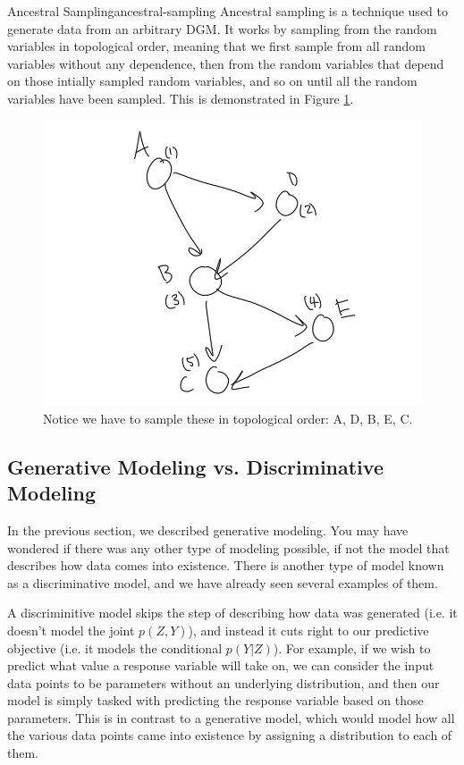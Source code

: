 \begin{definition}{Ancestral Sampling}{ancestral-sampling}
	Ancestral sampling is a technique used to generate data from an arbitrary DGM. It works by sampling from the random variables in topological order, meaning that we first sample from all random variables without any dependence, then from the random variables that depend on those intially sampled random variables, and so on until all the random variables have been sampled. This is demonstrated in Figure \ref{fig:ancestral-sampling}.
\end{definition}
\begin{figure}
	\centering
	\includegraphics[width=0.5\paperwidth]{../GraphicalModels/fig/AncestralSampling.png}
    \caption{Notice we have to sample these in topological order: A, D, B, E, C.}
	\label{fig:ancestral-sampling}
\end{figure}

\subsection{Generative Modeling vs. Discriminative Modeling}
In the previous section, we described generative modeling. You may have wondered if there was any other type of modeling possible, if not the model that describes how data comes into existence. There is another type of model known as a discriminative model, and we have already seen several examples of them.

A discriminitive model skips the step of describing how data was generated (i.e. it doesn't model the joint $p(Z, Y)$), and instead it cuts right to our predictive objective (i.e. it models the conditional $p(Y|Z)$). For example, if we wish to predict what value a response variable will take on, we can consider the input data points to be parameters without an underlying distribution, and then our model is simply tasked with predicting the response variable based on those parameters. This is in contrast to a generative model, which would model how all the various data points came into existence by assigning a distribution to each of them.

